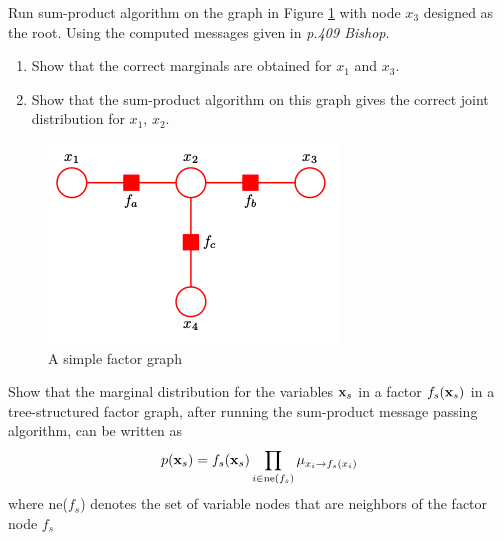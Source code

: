 \documentclass{amsmlaj}
\begin{document}
\begin{problem}
Run sum-product algorithm on the graph in Figure \ref{fig:simplegraph} with node
$x_3$ designed as the root. Using the computed messages given in \emph{p.409 Bishop}.
\begin{enumerate}
\item  Show that the correct marginals are obtained for $x_1$ and $x_3$.
\item Show that the sum-product algorithm on this graph gives the correct joint distribution for $x_1$, $x_2$.
\end{enumerate}

\begin{figure}[H]
\begin{center}
\includegraphics[width=.4\textwidth]{simplegraph.png}
\caption{A simple factor graph}
\label{fig:simplegraph}
\end{center}
\end{figure}

\end{problem}

\begin{problem}
Show that the marginal distribution for the variables $\bm{\mathbf{x}}_s$ in a factor
$f_s(\bm{\mathbf{x}}_s)$ in a tree-structured factor graph, after running the sum-product
message passing algorithm, can be written as
\[
p(\bm{\mathbf{x}}_s) = f_s(\bm{\mathbf{x}}_s) \prod\limits_{i \in \text{ne}(f_s)} \mu_{x_i \to f_s(x_i)}
\]
where ne($f_s$) denotes the set of variable nodes that are neighbors of the factor node $f_s$
\end{problem}
\end{document}
